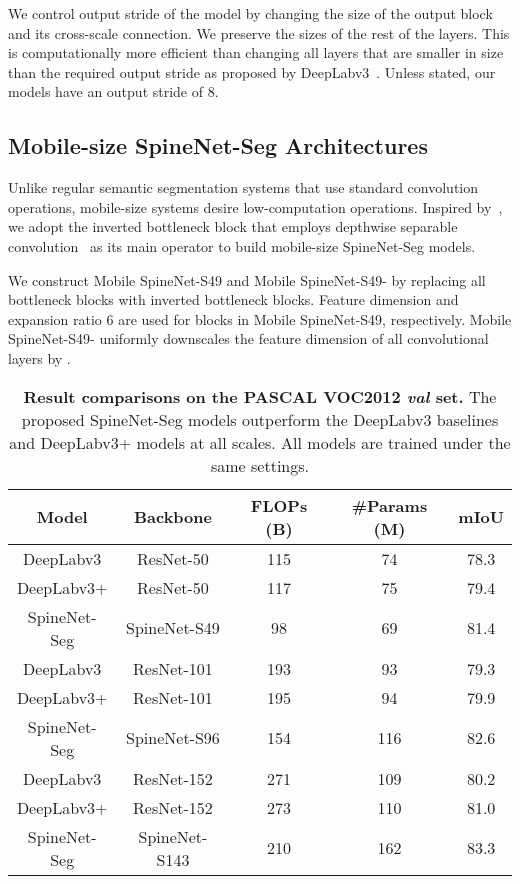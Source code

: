 \documentclass[10pt,twocolumn,letterpaper]{article}
\begin{document}
We control output stride of the model by changing the size of the output block and its cross-scale connection. We preserve the sizes of the rest of the layers. This is computationally more efficient than changing all layers that are smaller in size than the required output stride as proposed by DeepLabv3~\cite{deeplabv3}. Unless stated, our models have an output stride of 8.

\subsection{Mobile-size SpineNet-Seg Architectures}\label{sec:spinenet_seg_mobile}
Unlike regular semantic segmentation systems that use standard convolution operations, mobile-size systems desire low-computation operations. Inspired by~\cite{mobilenetv2,mobilenetv3,Du2020EfficientSB}, we adopt the inverted bottleneck block that employs depthwise separable convolution~\cite{xception} as its main operator to build mobile-size SpineNet-Seg models.

We construct Mobile SpineNet-S49 and Mobile SpineNet-S49- by replacing all bottleneck blocks with inverted bottleneck blocks. Feature dimension  and expansion ratio 6 are used for  blocks in Mobile SpineNet-S49, respectively. Mobile SpineNet-S49- uniformly downscales the feature dimension of all convolutional layers by .

\setlength{\tabcolsep}{4pt}
\begin{table*}[t!]
\centering
\begin{tabular}{c| c | c  c | c}
  \toprule
  Model & Backbone & FLOPs (B) & \#Params (M) & mIoU  \\
  \midrule
  DeepLabv3 & ResNet-50 &  115 & 74 & 78.3 \\
  DeepLabv3+ & ResNet-50 &  117 & 75 & 79.4 \\
  SpineNet-Seg & SpineNet-S49 & 98 & 69 & 81.4 \\
  \midrule
  DeepLabv3 & ResNet-101 & 193 & 93 & 79.3 \\
  DeepLabv3+ & ResNet-101 & 195  & 94 & 79.9 \\
  SpineNet-Seg & SpineNet-S96 & 154  & 116 & 82.6 \\
  \midrule
  DeepLabv3 & ResNet-152 & 271 & 109 & 80.2 \\
  DeepLabv3+ & ResNet-152 & 273  & 110 & 81.0 \\
  SpineNet-Seg & SpineNet-S143 & 210  & 162 & 83.3 \\
  \bottomrule
\end{tabular}
\caption{\textbf{Result comparisons on the PASCAL VOC2012 \textit{val} set.} The proposed SpineNet-Seg models outperform the DeepLabv3 baselines and DeepLabv3+ models at all scales. All models are trained under the same settings.}
\label{tab:pascal_main} 
\end{table*}
\end{document}

